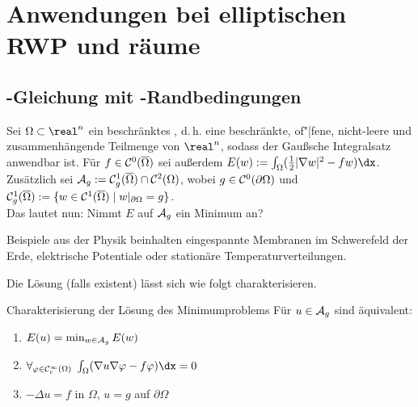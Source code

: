 \chapter{%
    Anwendungen bei elliptischen RWP und räume%
}

\section{%
    -Gleichung mit -Randbedingungen%
}

\begin{Bem}
    Sei $\Omega \subset \real^n$ ein beschränktes ,
    d.\,h. eine beschränkte, of"|fene, nicht-leere und zusammenhängende Teilmenge von $\real^n$,
    sodass der Gaußsche Integralsatz anwendbar ist.
    Für $f \in \mathcal{C}^0(\overline{\Omega})$ sei außerdem
    $E(w) := \int_\Omega (\frac{1}{2} |\nabla w|^2 - fw) \dx$.\\
    Zusätzlich sei $\mathcal{A}_g := \mathcal{C}^1_g(\overline{\Omega}) \cap \mathcal{C}^2(\Omega)$,
    wobei $g \in \mathcal{C}^0(\partial\Omega)$ und
    $\mathcal{C}^1_g(\overline{\Omega}) := \{w \in \mathcal{C}^1(\overline{\Omega}) \;|\;
    w|_{\partial \Omega} = g\}$.\\
    Das  lautet nun:
    Nimmt $E$ auf $\mathcal{A}_g$ ein Minimum an?

    Beispiele aus der Physik beinhalten
    eingespannte Membranen im Schwerefeld der Erde,
    elektrische Potentiale oder
    stationäre Temperaturverteilungen.
\end{Bem}

\linie

\begin{Bem}
    Die Lösung (falls existent) lässt sich wie folgt charakterisieren.
\end{Bem}

\begin{Satz}{Charakterisierung der Lösung des Minimumproblems}
    Für $u \in \mathcal{A}_g$ sind äquivalent:
    \begin{enumerate}
        \item
        $E(u) = \min_{w \in \mathcal{A}_g} E(w)$

        \item
        $\forall_{\varphi \in \C^\infty_c(\Omega)}\;
        \int_\Omega (\nabla u \nabla \varphi - f \varphi)\dx = 0$

        \item
        $-\Delta u = f$ in $\Omega$, $u = g$ auf $\partial \Omega$
    \end{enumerate}
\end{Satz}

